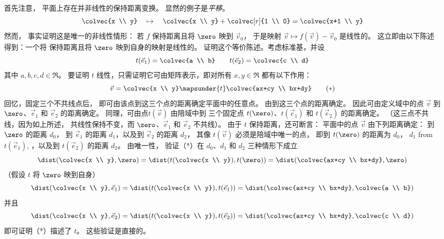 首先注意，
平面上存在并非线性的保持距离变换。
显然的例子是\emph{平移}。
\begin{equation*}
  \colvec{x \\ y}
  \quad\mapsto\quad
  \colvec{x \\ y}+\colvec[r]{1 \\ 0}=\colvec{x+1 \\ y}
\end{equation*}
然而，
事实证明这是唯一的非线性情形：
若 $f$ 保持距离且将 $\zero$ 映到 $\vec{v}_0$， 
于是映射 $\vec{v}\mapsto f(\vec{v})-\vec{v}_0$ 是线性的。
这立即由以下陈述得到：一个将
保持距离且将 $\zero$ 映到自身的映射是线性的。
证明这个等价陈述。考虑标准基，并设
\begin{equation*}
  t(\vec{e}_1)=\colvec{a \\ b}
  \qquad
  t(\vec{e}_2)=\colvec{c \\ d}
\end{equation*}
其中 $a,b,c,d\in\Re$。
要证明 $t$ 线性，只需证明它可由矩阵表示，即对所有 $x,y\in\Re$ 都有以下作用：
\begin{equation*}
  \vec{v}=\colvec{x  \\  y}
  \mapsunder{t}
  \colvec{ax+cy  \\  bx+dy}
\tag*{\text{($*$)}}\end{equation*}
回忆，固定三个不共线点后，
即可由该点到这三个点的距离确定平面中的任意点。
由到这三个点的距离确定。
因此可由定义域中的点 $\vec{v}$ 到
$\zero$、$\vec{e}_1$ 和 $\vec{e}_2$ 的距离确定。 
同理，可由点$t(\vec{v})$ 
由陪域中到
三个固定点 $t(\zero)$、$t(\vec{e}_1)$ 和 $t(\vec{e}_2)$ 的距离确定。
（这三点不共线，因为如上所述，
共线性保持不变，而
$\zero$、$\vec{e}_1$ 和 $\vec{e}_2$ 不共线）。
由于 $t$ 保持距离，还可断言：
平面中的点 $\vec{v}$ 由下列距离确定：
到 $\zero$ 的距离 $d_0$，
到 $\vec{e}_1$ 的距离 $d_1$，以及到 $\vec{e}_2$ 的距离 $d_2$，  
其像 $t(\vec{v})$ 必须是陪域中唯一的点，
即到 $t(\zero)$ 的距离为 $d_0$，
$d_1$ from $t(\vec{e}_1)$, 
，以及到 $t(\vec{e}_2)$ 的距离 $d_2$。
由唯一性，
验证（*）在 $d_0$、$d_1$ 和 $d_2$ 三种情形下成立
\begin{equation*}
  \dist(\colvec{x \\ y},\zero) 
  =\dist(t(\colvec{x \\ y}),t(\zero))
  =\dist(\colvec{ax+cy \\ bx+dy},\zero)
\end{equation*}
（假设 $t$ 将 $\zero$ 映到自身）
\begin{equation*}
  \dist(\colvec{x \\ y},\vec{e}_1)
  =\dist(t(\colvec{x \\ y}),t(\vec{e}_1))
  =\dist(\colvec{ax+cy \\ bx+dy},\colvec{a \\ b})  
\end{equation*}
并且
\begin{equation*}
  \dist(\colvec{x \\ y},\vec{e}_2)
  =\dist(t(\colvec{x \\ y}),t(\vec{e}_2))
  =\dist(\colvec{ax+cy \\ bx+dy},\colvec{c \\ d})
\end{equation*}
即可证明（*）描述了 $t$。
这些验证是直接的。

